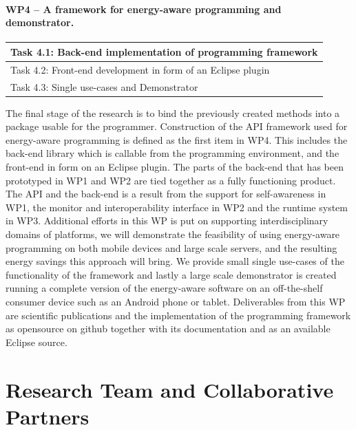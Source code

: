 \documentclass{article}
\begin{document}
\paragraph{WP4 -- A framework for energy-aware programming and demonstrator.}
\begin{table}
\vspace{-0.5cm}
\small
\begin{tabular}{ | l |}
\hline
Task 4.1: Back-end implementation of programming framework\\ \hline
Task 4.2: Front-end development in form of an Eclipse plugin \\ \hline
Task 4.3: Single use-cases and Demonstrator\\ \hline
\end{tabular}
\vspace{-0.3cm}
\end{table}
The final stage of the research is to bind the previously created methods into a package usable for the programmer.
Construction of the API framework used for energy-aware programming is defined as the first item in WP4.
This includes the back-end library which is callable from the programming environment, and the front-end in form on an Eclipse plugin.
The parts of the back-end that has been prototyped in WP1 and WP2 are tied together as a fully functioning product.
The API and the back-end is a result from the support for self-awareness in WP1, the monitor and interoperability interface in WP2 and the runtime system in WP3.
Additional efforts in this WP is put on supporting interdisciplinary domains of platforms, we will demonstrate the feasibility of using energy-aware programming on both mobile devices and large scale servers,
and the resulting energy savings this approach will bring.
We provide small single use-cases of the functionality of the framework and lastly a large scale demonstrator is created running a complete version of the energy-aware software on an off-the-shelf consumer device such as an Android phone or tablet.
Deliverables from this WP are scientific publications and the implementation of the programming framework as opensource on github together with its documentation and as an available Eclipse source.

\section{Research Team and Collaborative Partners}
\end{document}
